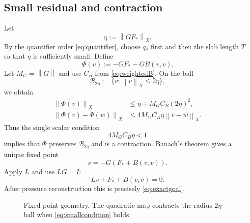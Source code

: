 \documentclass[11pt]{article}
\numberwithin{equation}{section}
\newcommand{\norm}[1]{\left\lVert #1\right\rVert}
\newcommand{\cB}{\mathcal B}
\begin{document}
\subsection{Small residual and contraction}
Let
\begin{equation}
\eta:=\norm{GF_*}_X.
\label{eq:eta}
\end{equation}
By the quantifier order \eqref{eq:quantifier}, choose \(q_*\) first and then the slab length \(T\) so that \(\eta\) is sufficiently small.  Define
\begin{equation}
\Phi(v):=-GF_*-GB(v,v).
\label{eq:Phi}
\end{equation}
Let \(M_G=\norm G\) and use \(C_B\) from \eqref{eq:weightedB}.  On the ball
\begin{equation}
\cB_{2\eta}:=\{v:\norm v_X\le2\eta\},
\label{eq:ball}
\end{equation}
we obtain
\begin{align}
\norm{\Phi(v)}_X
&\le\eta+M_GC_B(2\eta)^2,\label{eq:ballmap}\\
\norm{\Phi(v)-\Phi(w)}_X
&\le4M_GC_B\eta\norm{v-w}_X.\label{eq:contract}
\end{align}
Thus the single scalar condition
\begin{equation}
\boxed{4M_GC_B\eta<1}
\label{eq:smallcondition}
\end{equation}
implies that \(\Phi\) preserves \(\cB_{2\eta}\) and is a contraction.  Banach's theorem gives a unique fixed point
\begin{equation}
v=-G(F_*+B(v,v)).
\label{eq:fixedpoint}
\end{equation}
Apply \(L\) and use \(LG=I\):
\begin{equation}
Lv+F_*+B(v,v)=0.
\label{eq:reszero}
\end{equation}
After pressure reconstruction this is precisely \eqref{eq:exactgoal}.

\begin{figure}[ht]
\centering
{}
\caption{Fixed-point geometry.  The quadratic map contracts the radius-\(2\eta\) ball when \eqref{eq:smallcondition} holds.}
\label{fig:fixedpoint}
\end{figure}
\end{document}
